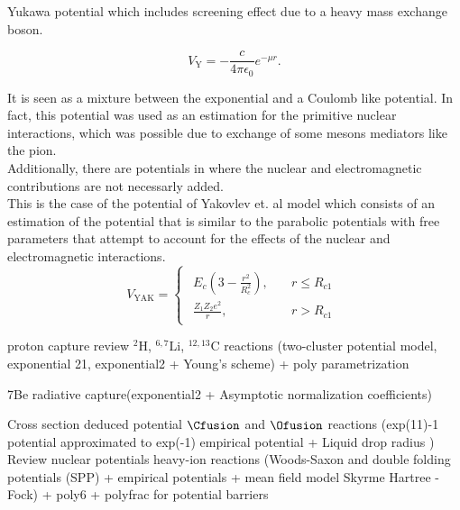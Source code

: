 \documentclass[openany]{book}
\begin{document}
Yukawa potential  which includes screening effect due to a heavy mass exchange boson.

\begin{equation} \label{eq:potential_Yukawa}
	V_{\mathrm{Y}} = -\frac{c}{4\pi\epsilon_0}e^{-\mu r}.
\end{equation}

It is seen as a mixture between the exponential and a Coulomb like potential. In fact, this potential was used as an estimation for the primitive nuclear interactions, which was possible due to exchange of some mesons mediators like the pion. \\

Additionally, there are potentials in where the nuclear and electromagnetic contributions are not necessarly added. \\

This is the case of the potential of Yakovlev et. al model \cite{yakovlev_beard_gasques_wiescher_2010} which consists of an estimation of the potential that is similar to the parabolic potentials with free parameters that attempt to account for the effects of the nuclear and electromagnetic interactions.  \\

\begin{equation} \label{eq:potential_Yakovlev}
	V_{\mathrm{YAK}} = 	\left\{\begin{array}{l}
		\begin{split}
			E_c\left(3 - \frac{r^2}{R_c^2}\right), \quad &r \le R_{c1} \\ 
			\frac{Z_1Z_2e^2}{r}, \quad &r > R_{c1}	
		\end{split}
	\end{array}\right.
\end{equation}


proton capture review $\mathrm{{}^{2}H}$, $\mathrm{{}^{6,7}Li}$, $\mathrm{^{12, 13}C}$ reactions (two-cluster potential model, exponential 21, exponential2 + Young's scheme) + poly parametrization \cite{dubovichenko_dzhazairov-kakhramanov_2012}

7Be radiative capture(exponential2 + Asymptotic normalization coefficients) \cite{tursunov_turakulov_kadyrov_blokhintsev_2021}

Cross section deduced potential  $\Cfusion$ and $\Ofusion$ reactions (exp(11)-1 potential approximated to exp(-1) empirical potential + Liquid drop radius )\cite{bass_1977} Review nuclear potentials heavy-ion reactions (Woods-Saxon and double folding potentials (SPP) + empirical potentials  + mean field model Skyrme Hartree - Fock) + poly6 + polyfrac for potential barriers \cite{nandi_swami_gupta_kumar_chakraborty_manjunatha_2022}
\end{document}
